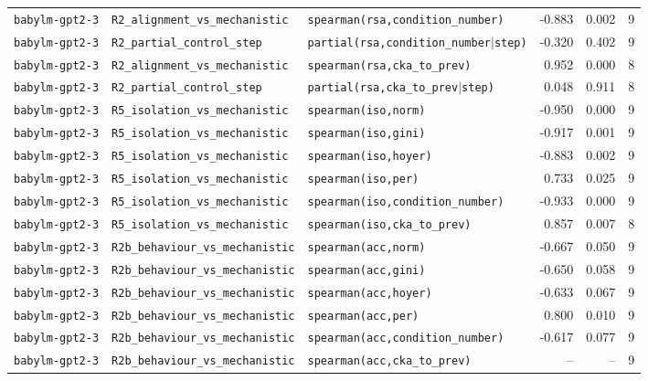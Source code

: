 \begin{longtable}{lllrrr}
\texttt{babylm-gpt2-3} & \texttt{R2\_alignment\_vs\_mechanistic} & \texttt{spearman(rsa,condition\_number)} & -0.883 & 0.002 & 9 \\
\texttt{babylm-gpt2-3} & \texttt{R2\_partial\_control\_step} & \texttt{partial(rsa,condition\_number$\mid$step)} & -0.320 & 0.402 & 9 \\
\texttt{babylm-gpt2-3} & \texttt{R2\_alignment\_vs\_mechanistic} & \texttt{spearman(rsa,cka\_to\_prev)} & 0.952 & 0.000 & 8 \\
\texttt{babylm-gpt2-3} & \texttt{R2\_partial\_control\_step} & \texttt{partial(rsa,cka\_to\_prev$\mid$step)} & 0.048 & 0.911 & 8 \\
\texttt{babylm-gpt2-3} & \texttt{R5\_isolation\_vs\_mechanistic} & \texttt{spearman(iso,norm)} & -0.950 & 0.000 & 9 \\
\texttt{babylm-gpt2-3} & \texttt{R5\_isolation\_vs\_mechanistic} & \texttt{spearman(iso,gini)} & -0.917 & 0.001 & 9 \\
\texttt{babylm-gpt2-3} & \texttt{R5\_isolation\_vs\_mechanistic} & \texttt{spearman(iso,hoyer)} & -0.883 & 0.002 & 9 \\
\texttt{babylm-gpt2-3} & \texttt{R5\_isolation\_vs\_mechanistic} & \texttt{spearman(iso,per)} & 0.733 & 0.025 & 9 \\
\texttt{babylm-gpt2-3} & \texttt{R5\_isolation\_vs\_mechanistic} & \texttt{spearman(iso,condition\_number)} & -0.933 & 0.000 & 9 \\
\texttt{babylm-gpt2-3} & \texttt{R5\_isolation\_vs\_mechanistic} & \texttt{spearman(iso,cka\_to\_prev)} & 0.857 & 0.007 & 8 \\
\texttt{babylm-gpt2-3} & \texttt{R2b\_behaviour\_vs\_mechanistic} & \texttt{spearman(acc,norm)} & -0.667 & 0.050 & 9 \\
\texttt{babylm-gpt2-3} & \texttt{R2b\_behaviour\_vs\_mechanistic} & \texttt{spearman(acc,gini)} & -0.650 & 0.058 & 9 \\
\texttt{babylm-gpt2-3} & \texttt{R2b\_behaviour\_vs\_mechanistic} & \texttt{spearman(acc,hoyer)} & -0.633 & 0.067 & 9 \\
\texttt{babylm-gpt2-3} & \texttt{R2b\_behaviour\_vs\_mechanistic} & \texttt{spearman(acc,per)} & 0.800 & 0.010 & 9 \\
\texttt{babylm-gpt2-3} & \texttt{R2b\_behaviour\_vs\_mechanistic} & \texttt{spearman(acc,condition\_number)} & -0.617 & 0.077 & 9 \\
\texttt{babylm-gpt2-3} & \texttt{R2b\_behaviour\_vs\_mechanistic} & \texttt{spearman(acc,cka\_to\_prev)} & -- & -- & 9 \\

\end{longtable}
